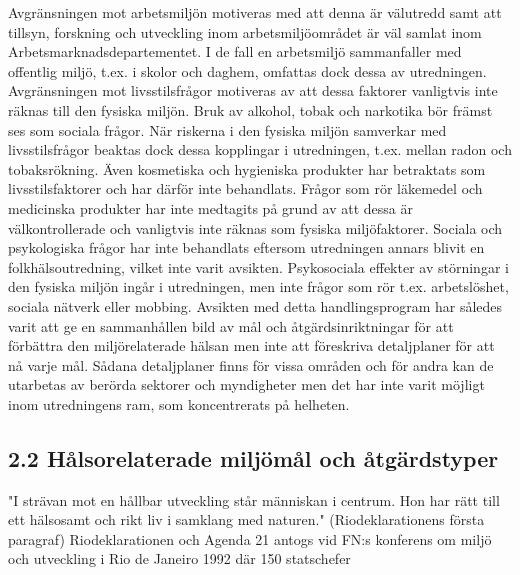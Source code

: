Avgränsningen mot arbetsmiljön motiveras med att denna är välutredd samt att tillsyn, forskning och utveckling inom arbetsmiljöområdet är väl samlat inom Arbetsmarknadsdepartementet. I de fall en arbetsmiljö sammanfaller med offentlig miljö, t.ex. i skolor och daghem, omfattas dock dessa av utredningen.
Avgränsningen mot livsstilsfrågor motiveras av att dessa faktorer vanligtvis inte räknas till den fysiska miljön. Bruk av alkohol, tobak och narkotika bör främst ses som sociala frågor. När riskerna i den fysiska miljön samverkar med livsstilsfrågor beaktas dock dessa kopplingar i utredningen, t.ex. mellan radon och tobaksrökning. Även kosmetiska och hygieniska produkter har betraktats som livsstilsfaktorer och har därför inte behandlats.
Frågor som rör läkemedel och medicinska produkter har inte medtagits på grund av att dessa är välkontrollerade och vanligtvis inte räknas som fysiska miljöfaktorer.
Sociala och psykologiska frågor har inte behandlats eftersom utredningen annars blivit en folkhälsoutredning, vilket inte varit avsikten. Psykosociala effekter av störningar i den fysiska miljön ingår i utredningen, men inte frågor som rör t.ex. arbetslöshet, sociala nätverk eller mobbing.
Avsikten med detta handlingsprogram har således varit att ge en sammanhållen bild av mål och åtgärdsinriktningar för att förbättra den miljörelaterade hälsan men inte att föreskriva detaljplaner för att nå varje mål. Sådana detaljplaner finns för vissa områden och för andra kan de utarbetas av berörda sektorer och myndigheter men det har inte varit möjligt inom utredningens ram, som koncentrerats på helheten.
\subsection*{2.2 Hålsorelaterade miljömål och åtgärdstyper}
"I strävan mot en hållbar utveckling står människan i centrum. Hon har rätt till ett hälsosamt och rikt liv i samklang med naturen."
(Riodeklarationens första paragraf)
Riodeklarationen och Agenda 21 antogs vid FN:s konferens om miljö och utveckling i Rio de Janeiro 1992 där 150 statschefer

